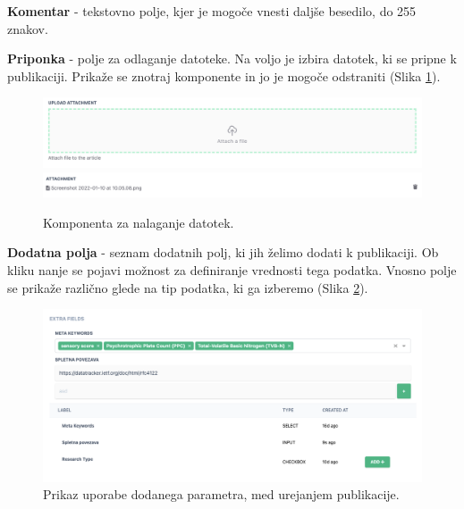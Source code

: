\documentclass[a4paper, 12pt]{book}
\begin{document}
\begin{description}
\item \textbf{Komentar} - tekstovno polje, kjer je mogoče vnesti daljše besedilo, do 255 znakov.

\item \textbf{Priponka} - polje za odlaganje datoteke. Na voljo je izbira datotek, ki se pripne k publikaciji. Prikaže se znotraj komponente in jo je mogoče odstraniti (Slika  \ref{type-fileupload}).

\begin{figure}[h]
\begin{center}
\includegraphics[width=1\textwidth]{slike/upload_file_zone.png}
\includegraphics[width=1\textwidth]{slike/upload_file_list.png}
\end{center}
\caption{ Komponenta za nalaganje datotek. }
\label{type-fileupload}
\end{figure}

\item \textbf{Dodatna polja} - seznam dodatnih polj, ki jih želimo dodati k publikaciji. Ob kliku nanje se pojavi možnost za definiranje vrednosti tega podatka. Vnosno polje se prikaže različno glede na tip podatka, ki ga izberemo (Slika \ref{fields-usage}).
\begin{figure}[h]
\begin{center}
\includegraphics[width=1\textwidth]{slike/fields_usage.png}
\end{center}
\caption{ Prikaz uporabe dodanega parametra, med urejanjem publikacije. }
\label{fields-usage}
\end{figure}

\end{description}
\end{document}
